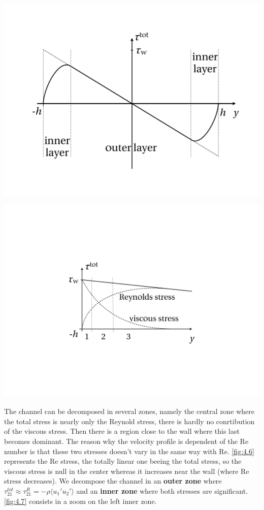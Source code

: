 		\begin{center}
		\begin{minipage}{0.49\textwidth}
		\includegraphics[scale=0.25]{ch4/6}
		\label{fig:4.6}
		\end{minipage}
		\begin{minipage}{0.49\textwidth}
		\includegraphics[scale=0.4]{ch4/7}
		\label{fig:4.7}
		\end{minipage}
		\end{center}
		
		The channel can be decomposed in several zones, namely the central zone where the total stress is nearly only the Reynold stress, there is hardly no conrtibution of the viscous stress. Then there is a region close to the wall where this last becomes dominant. The reason why the velocity profile is dependent of the Re number is that these two stresses doesn't vary in the same way with Re. \autoref{fig:4.6} represents the Re stress, the totally linear one beeing the total stress, so the viscous stress is null in the center whereas it increases near the wall (where Re stress decreases). We decompose the channel in an \textbf{outer zone }where $\tau _{21}^{tot} \approx \tau _{21} ^R = -\rho \langle u_1'u_2' \rangle$ and an \textbf{inner zone} where both stresses are significant. \autoref{fig:4.7} consists in a zoom on the left inner zone. \\
		
